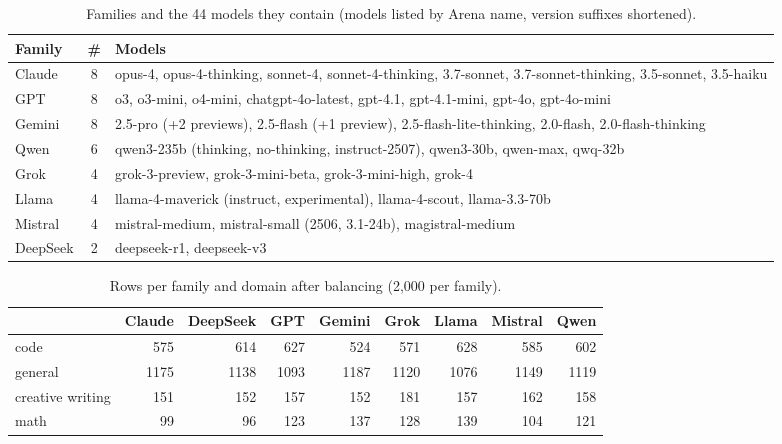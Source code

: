 \documentclass[11pt]{article}
\begin{document}
\begin{table}[htbp]
\centering\small
\caption{Families and the 44 models they contain (models listed by Arena name, version suffixes shortened).}
\label{tab:families}
\begin{tabular}{@{}lcp{11.2cm}@{}}
\toprule
Family & \# & Models \\ \midrule
Claude & 8 & opus-4, opus-4-thinking, sonnet-4, sonnet-4-thinking, 3.7-sonnet, 3.7-sonnet-thinking, 3.5-sonnet, 3.5-haiku \\
GPT & 8 & o3, o3-mini, o4-mini, chatgpt-4o-latest, gpt-4.1, gpt-4.1-mini, gpt-4o, gpt-4o-mini \\
Gemini & 8 & 2.5-pro (+2 previews), 2.5-flash (+1 preview), 2.5-flash-lite-thinking, 2.0-flash, 2.0-flash-thinking \\
Qwen & 6 & qwen3-235b (thinking, no-thinking, instruct-2507), qwen3-30b, qwen-max, qwq-32b \\
Grok & 4 & grok-3-preview, grok-3-mini-beta, grok-3-mini-high, grok-4 \\
Llama & 4 & llama-4-maverick (instruct, experimental), llama-4-scout, llama-3.3-70b \\
Mistral & 4 & mistral-medium, mistral-small (2506, 3.1-24b), magistral-medium \\
DeepSeek & 2 & deepseek-r1, deepseek-v3 \\ \bottomrule
\end{tabular}
\end{table}

\begin{table}[htbp]
\centering\small
\caption{Rows per family and domain after balancing (2{,}000 per family).}
\label{tab:domains}
\begin{tabular}{@{}lrrrrrrrr@{}}
\toprule
 & Claude & DeepSeek & GPT & Gemini & Grok & Llama & Mistral & Qwen \\ \midrule
code & 575 & 614 & 627 & 524 & 571 & 628 & 585 & 602 \\
general & 1175 & 1138 & 1093 & 1187 & 1120 & 1076 & 1149 & 1119 \\
creative writing & 151 & 152 & 157 & 152 & 181 & 157 & 162 & 158 \\
math & 99 & 96 & 123 & 137 & 128 & 139 & 104 & 121 \\ \bottomrule
\end{tabular}
\end{table}
\end{document}
